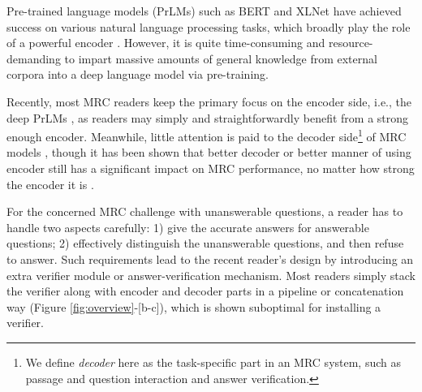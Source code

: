 \documentclass[letterpaper]{article} %
\begin{document}
Pre-trained language models (PrLMs) such as BERT \cite{devlin2018bert} and XLNet \cite{yang2019xlnet} have achieved success on various natural language processing tasks, which broadly play the role of a powerful encoder \cite{zhang2019explicit,li2020explicit,zhou2019limit}. %
However, it is quite time-consuming and resource-demanding to impart massive amounts of general knowledge from external corpora into a deep language model via pre-training. %



Recently, most MRC readers keep the primary focus on the encoder side, i.e., the deep PrLMs \cite{devlin2018bert,yang2019xlnet,Lan2020ALBERT}, as readers may simply and straightforwardly benefit from a strong enough encoder. Meanwhile, little attention is paid to the decoder side\footnote{We define \textit{decoder} here as the task-specific part in an MRC system, such as passage and question interaction and answer verification.} of MRC models %
\cite{hu2019read,back2020neurquri,reddy2020answer}, though it has been shown that better decoder or better manner of using encoder still has a significant impact on MRC performance, no matter how strong the encoder it is \cite{dcmn20,liu2021filling,li2019dependency,li2018unified,zhu2020dual}. 


For the concerned MRC challenge with unanswerable questions, a reader has to handle two aspects carefully: 1) give the accurate answers for answerable questions; 2) effectively distinguish the unanswerable questions, and then refuse to answer. Such requirements lead to the recent reader's design by introducing an extra verifier module or answer-verification mechanism. Most readers simply stack the verifier along with encoder and decoder parts in a pipeline or concatenation way (Figure \ref{fig:overview}-[b-c]), which is shown suboptimal for installing a verifier.
\end{document}
